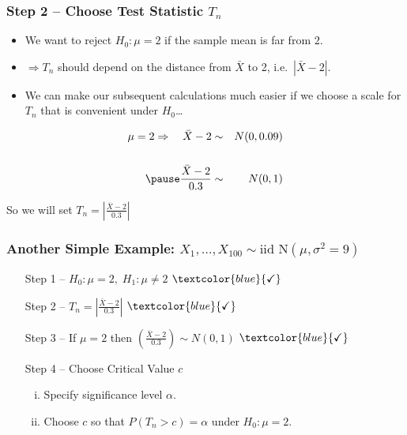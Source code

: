 \begin{frame}
  \frametitle{Step 2 -- Choose Test Statistic $T_n$}
  \begin{itemize}
    \item We want to reject $H_0\colon \mu = 2$ if the sample mean is far from $2$. \pause
    \item $\Rightarrow T_n$ should depend on the \alert{distance} from $\bar{X}$ to 2, i.e.\ $|\bar{X} - 2|$.\pause
    \item We can make our subsequent calculations much easier if we choose a \alert{scale for $T_n$ that is convenient under $H_0$\dots}
  \end{itemize}
  \begin{eqnarray*}
    \mu=2 \Rightarrow \quad \bar{X} - 2 &\sim& N(0, 0.09) \\ \\ \pause
    \frac{\bar{X} - 2}{0.3} &\sim& N(0,1)
  \end{eqnarray*}

  \alert{So we will set $\displaystyle T_n = \left|\frac{\bar{X} - 2}{0.3}\right|$}

\end{frame}
\begin{frame}
  \frametitle{Another Simple Example: $X_1, \dots, X_{100}\sim \mbox{iid N}(\mu, \sigma^2 = 9)$}
  \begin{enumerate}
    \item[Step 1] -- $H_0\colon \mu = 2, \; H_1\colon \mu \neq 2$ $\textcolor{blue}{\checkmark}$
    \item[Step 2] -- $T_n = \displaystyle \left|\frac{\bar{X} - 2}{0.3} \right|$ $\textcolor{blue}{\checkmark}$
    \item[Step 3] -- If $\mu = 2$ then $\displaystyle \left(\frac{\bar{X} - 2}{0.3}\right) \sim N(0,1)$ $\textcolor{blue}{\checkmark}$
    \item[Step 4] -- \alert{Choose Critical Value $c$}
      \begin{enumerate}[(i)]
        \item Specify significance level $\alpha$.
        \item Choose $c$ so that $P(T_n > c)=\alpha$ under $H_0\colon \mu = 2$.
      \end{enumerate}
  \end{enumerate}
\end{frame}

